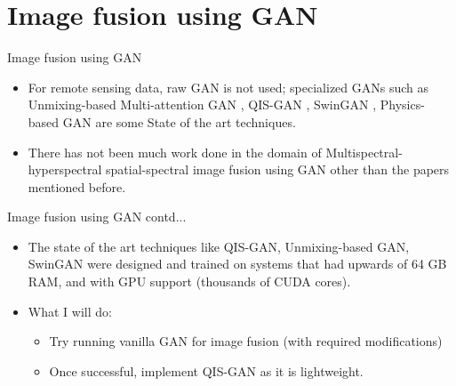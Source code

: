 \documentclass{beamer}
\begin{document}
\section{Image fusion using GAN}
\begin{frame}{Image fusion using GAN}
    \begin{itemize}
        \item For remote sensing data, raw GAN is not used; specialized GANs such as Unmixing-based Multi-attention GAN \cite{Su2023}, QIS-GAN \cite{Zhu2023}, SwinGAN \cite{Zhu2023a}, Physics-based GAN \cite{Xiao2021} are some State of the art techniques.
        \item There has not been much work done in the domain of Multispectral-hyperspectral spatial-spectral image fusion using GAN other than the papers mentioned before.
    \end{itemize}
\end{frame}
\begin{frame}{Image fusion using GAN contd...}
    \begin{itemize}
        \item The state of the art techniques like QIS-GAN, Unmixing-based GAN, SwinGAN were designed and trained on systems that had upwards of 64 GB RAM, and with GPU support (thousands of CUDA cores).
        \item What I will do:
        \begin{itemize}
            \item Try running vanilla GAN for image fusion (with required modifications)
            \item Once successful, implement QIS-GAN as it is lightweight.
        \end{itemize}
    \end{itemize}
\end{frame}
\end{document}
